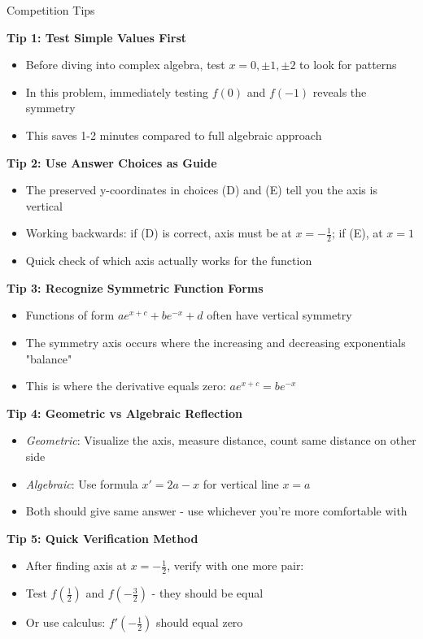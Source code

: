 \documentclass[12pt]{article}
\begin{document}
\begin{protipbox}{Competition Tips}

\textbf{Tip 1: Test Simple Values First}
\begin{itemize}
    \item Before diving into complex algebra, test $x = 0, \pm 1, \pm 2$ to look for patterns
    \item In this problem, immediately testing $f(0)$ and $f(-1)$ reveals the symmetry
    \item This saves 1-2 minutes compared to full algebraic approach
\end{itemize}

\textbf{Tip 2: Use Answer Choices as Guide}
\begin{itemize}
    \item The preserved y-coordinates in choices (D) and (E) tell you the axis is vertical
    \item Working backwards: if (D) is correct, axis must be at $x = -\frac{1}{2}$; if (E), at $x = 1$
    \item Quick check of which axis actually works for the function
\end{itemize}

\textbf{Tip 3: Recognize Symmetric Function Forms}
\begin{itemize}
    \item Functions of form $ae^{x+c} + be^{-x} + d$ often have vertical symmetry
    \item The symmetry axis occurs where the increasing and decreasing exponentials "balance"
    \item This is where the derivative equals zero: $ae^{x+c} = be^{-x}$
\end{itemize}

\textbf{Tip 4: Geometric vs Algebraic Reflection}
\begin{itemize}
    \item \textit{Geometric}: Visualize the axis, measure distance, count same distance on other side
    \item \textit{Algebraic}: Use formula $x' = 2a - x$ for vertical line $x = a$
    \item Both should give same answer - use whichever you're more comfortable with
\end{itemize}

\textbf{Tip 5: Quick Verification Method}
\begin{itemize}
    \item After finding axis at $x = -\frac{1}{2}$, verify with one more pair:
    \item Test $f(\frac{1}{2})$ and $f(-\frac{3}{2})$ - they should be equal
    \item Or use calculus: $f'(-\frac{1}{2})$ should equal zero
\end{itemize}

\end{protipbox}
\end{document}
